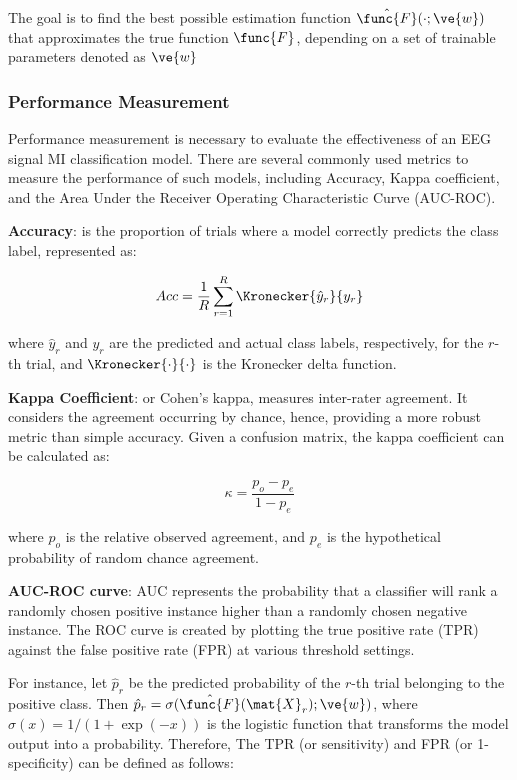 The goal is to find the best possible estimation function $\hat{\func{F}}(\cdot; \ve{w})$ that approximates the true function $\func{F}$, depending on a set of trainable parameters denoted as $\ve{w}$

\subsubsection{Performance Measurement}

Performance measurement is necessary to evaluate the effectiveness of an EEG signal MI classification model. There are several commonly used metrics to measure the performance of such models, including Accuracy, Kappa coefficient, and the Area Under the Receiver Operating Characteristic Curve (AUC-ROC).

\textbf{Accuracy}: is the proportion of trials where a model correctly predicts the class label, represented as:

\begin{equation}
Acc = \frac{1}{R} \sum_{r=1}^{R} \Kronecker{\hat{y}_r}{y_r}
\end{equation}


where $\hat{y}_r$ and $y_r$ are the predicted and actual class labels, respectively, for the $r$-th trial, and $\Kronecker{\cdot}{\cdot}$ is the Kronecker delta function.

\textbf{Kappa Coefficient}: or Cohen’s kappa, measures inter-rater agreement. It considers the agreement occurring by chance, hence, providing a more robust metric than simple accuracy. Given a confusion matrix, the kappa coefficient can be calculated as:

\begin{equation}
\kappa = \frac{p_o - p_e}{1 - p_e}    
\end{equation}

where $p_o$ is the relative observed agreement, and $p_e$ is the hypothetical probability of random chance agreement.

\textbf{AUC-ROC curve}: AUC represents the probability that a classifier will rank a randomly chosen positive instance higher than a randomly chosen negative instance. The ROC curve is created by plotting the true positive rate (TPR) against the false positive rate (FPR) at various threshold settings.

For instance, let $\hat{p}_r$ be the predicted probability of the $r$-th trial belonging to the positive class. Then $\hat{p}_r = \sigma(\hat{\func{F}}(\mat{X}_r); \ve{w})$, where $\sigma(x) = 1/(1 + \exp(-x))$ is the logistic function that transforms the model output into a probability. Therefore, The TPR (or sensitivity) and FPR (or 1-specificity) can be defined as follows:


